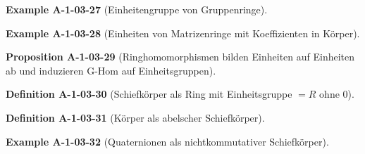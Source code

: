 \documentclass[10pt, letterpaper]{article}
\newcommand{\CustomHeading}[3]{%
  \par\medskip\noindent%
  \textbf{#1 #2} \textnormal{(#3)}.\enskip%
}
\newenvironment{DEF}[2]{\CustomHeading{Definition}{#1}{#2}}{}
\newenvironment{PROP}[2]{\CustomHeading{Proposition}{#1}{#2}}{}
\newenvironment{EXA}[2]{\CustomHeading{Example}{#1}{#2}}{}
\begin{document}

\begin{EXA}{A-1-03-27}{Einheitengruppe von Gruppenringe}
\end{EXA}


\begin{EXA}{A-1-03-28}{Einheiten von Matrizenringe mit Koeffizienten in Körper}
\end{EXA}


\begin{PROP}{A-1-03-29}{Ringhomomorphismen bilden Einheiten auf Einheiten ab und induzieren G-Hom auf Einheitsgruppen}
\end{PROP}


\begin{DEF}{A-1-03-30}{Schiefkörper als Ring mit Einheitsgruppe $= R$ ohne $0$}
\end{DEF}


\begin{DEF}{A-1-03-31}{Körper als abelscher Schiefkörper}
\end{DEF}


\begin{EXA}{A-1-03-32}{Quaternionen als nichtkommutativer Schiefkörper}
\end{EXA}
\end{document}
